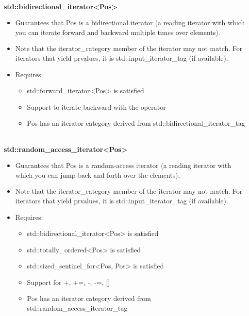 \noindent
\hspace*{\fill} \\ %
\textbf{std::bidirectional\_iterator<Pos>}

\begin{itemize}
\item
Guarantees that Pos is a bidirectional iterator (a reading iterator with which you can iterate forward and backward multiple times over elements).

\item
Note that the iterator\_category member of the iterator may not match. For iterators that yield prvalues, it is std::input\_iterator\_tag (if available).

\item
Requires:
\begin{itemize}
\item
std::forward\_iterator<Pos> is satisfied

\item
Support to iterate backward with the operator -{}-

\item
Pos has an iterator category derived from std::bidirectional\_iterator\_tag
\end{itemize}
\end{itemize}

\noindent
\hspace*{\fill} \\ %
\textbf{std::random\_access\_iterator<Pos>}

\begin{itemize}
\item
Guarantees that Pos is a random-access iterator (a reading iterator with which you can jump back and forth over the elements).

\item
Note that the iterator\_category member of the iterator may not match. For iterators that yield prvalues, it is std::input\_iterator\_tag (if available).

\item
Requires:
\begin{itemize}
\item
std::bidirectional\_iterator<Pos> is satisfied

\item
std::totally\_ordered<Pos> is satisfied

\item
std::sized\_sentinel\_for<Pos, Pos> is satisfied

\item
Support for +, +=, -, -=, []

\item
Pos has an iterator category derived from std::random\_access\_iterator\_tag
\end{itemize}
\end{itemize}

